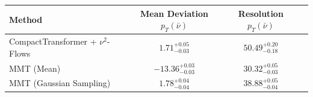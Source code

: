     \begin{tabular}{lccc}
        \toprule
        Method & Mean Deviation $p_{T}(\bar{\nu})$ & Resolution $p_{T}(\bar{\nu})$ \\
        \midrule
        CompactTransformer + $\nu^2$-Flows & $1.71^{+0.05}_{-0.03}$ & $50.49^{+0.20}_{-0.18}$ \\
        MMT (Mean) & $-13.36^{+0.03}_{-0.03}$ & $30.32^{+0.05}_{-0.03}$ \\
        MMT (Gaussian Sampling) & $1.78^{+0.04}_{-0.04}$ & $38.88^{+0.05}_{-0.04}$ \\
        \bottomrule
    \end{tabular}